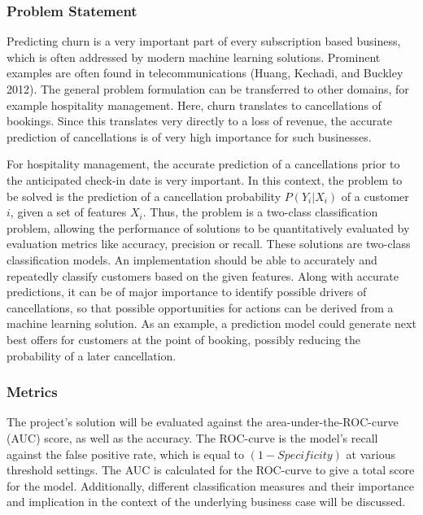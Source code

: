 \documentclass[
]{article}
\begin{document}
\hypertarget{problem-statement}{%
\subsubsection{Problem Statement}\label{problem-statement}}

Predicting churn is a very important part of every subscription based
business, which is often addressed by modern machine learning solutions.
Prominent examples are often found in telecommunications (Huang,
Kechadi, and Buckley 2012). The general problem formulation can be
transferred to other domains, for example hospitality management. Here,
churn translates to cancellations of bookings. Since this translates
very directly to a loss of revenue, the accurate prediction of
cancellations is of very high importance for such businesses.

For hospitality management, the accurate prediction of a cancellations
prior to the anticipated check-in date is very important. In this
context, the problem to be solved is the prediction of a cancellation
probability \(P(Y_i \vert X_i)\) of a customer \(i\), given a set of
features \(X_i\). Thus, the problem is a two-class classification
problem, allowing the performance of solutions to be quantitatively
evaluated by evaluation metrics like accuracy, precision or recall.
These solutions are two-class classification models. An implementation
should be able to accurately and repeatedly classify customers based on
the given features. Along with accurate predictions, it can be of major
importance to identify possible drivers of cancellations, so that
possible opportunities for actions can be derived from a machine
learning solution. As an example, a prediction model could generate next
best offers for customers at the point of booking, possibly reducing the
probability of a later cancellation.

\hypertarget{metrics}{%
\subsubsection{Metrics}\label{metrics}}

The project's solution will be evaluated against the
area-under-the-ROC-curve (AUC) score, as well as the accuracy. The
ROC-curve is the model's recall against the false positive rate, which
is equal to \((1 - Specificity)\) at various threshold settings. The AUC
is calculated for the ROC-curve to give a total score for the model.
Additionally, different classification measures and their importance and
implication in the context of the underlying business case will be
discussed.
\end{document}

